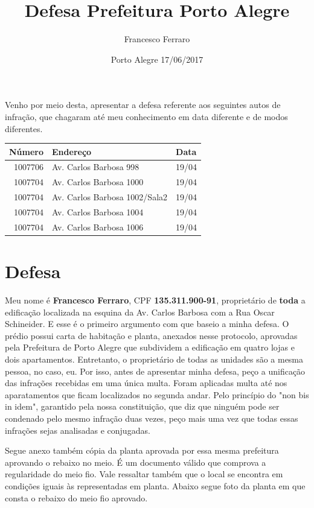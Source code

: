 \documentclass[11pt]{article}
\author{Francesco Ferraro}
\date{Porto Alegre 17/06/2017}
\title{Defesa Prefeitura Porto Alegre}
\begin{document}
\maketitle
Venho por meio desta, apresentar a defesa referente aos seguintes
autos de infração, que chagaram até meu conhecimento em data
diferente e de modos diferentes.

\begin{center}
\begin{tabular}{rll}
Número & Endereço & Data\\
\hline
1007706 & Av. Carlos Barbosa 998 & 19/04\\
1007704 & Av. Carlos Barbosa 1000 & 19/04\\
1007704 & Av. Carlos Barbosa 1002/Sala2 & 19/04\\
1007704 & Av. Carlos Barbosa 1004 & 19/04\\
1007704 & Av. Carlos Barbosa 1006 & 19/04\\
\end{tabular}
\end{center}


\section{Defesa}
\label{sec:org38acf5a}

Meu nome é \textbf{Francesco Ferraro}, CPF \textbf{135.311.900-91}, proprietário de
\textbf{toda} a edificação localizada na esquina da Av. Carlos Barbosa com a
Rua Oscar Schineider. E esse é o primeiro argumento com que baseio a
minha defesa. O prédio possui carta de habitação e planta, anexados
nesse protocolo, aprovadas pela Prefeitura de Porto Alegre que
subdividem a edificação em quatro lojas e dois
apartamentos. Entretanto, o proprietário de todas as unidades são a
mesma pessoa, no caso, eu.  Por isso, antes de apresentar minha
defesa, peço a unificação das infrações recebidas em uma única
multa.  Foram aplicadas multa até nos aparatamentos que ficam
localizados no segunda andar. Pelo princípio do "non bis in idem",
garantido pela nossa constituição, que diz que ninguém pode ser
condenado pelo mesmo infração duas vezes, peço mais uma vez que
todas essas infrações sejas analisadas e conjugadas.
\newpage

Segue anexo também cópia da planta aprovada por essa mesma prefeitura
aprovando o rebaixo no meio. É um documento válido que comprova a
regularidade do meio fio. Vale ressaltar também que o local se
encontra em condições iguais às representadas em planta. Abaixo segue
foto da planta em que consta o rebaixo do meio fio aprovado.
\end{document}

